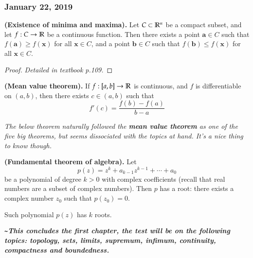 \subsubsection*{January 22, 2019}

\begin{theorem}
  \textbf{(Existence of minima and maxima).} Let $C\subset \mathbb{R}^n$ be a compact subset, and let $f : C\rightarrow \mathbb{R}$ be a continuous function. Then there exists a point $\bm{a}\in C$ such that $f(\bm{a})\geq f(\bm{x})$ for all $\bm{x}\in C$, and a point $\bm{b}\in C$ such that $f(\bm{b})\leq f(\bm{x})$ for all $\bm{x}\in C$.
\end{theorem}
\begin{proof}
  \textit{Detailed in textbook p.109. }
\end{proof}

\begin{theorem}
	  \textbf{(Mean value theorem).} If $f : [a,b] \rightarrow \mathbb{R}$ is continuous, and $f$ is differentiable on $(a,b)$, then there exists $c\in (a,b)$ such that
  \begin{equation}
  	f'(c)=\frac{f(b)-f(a)}{b-a}
  \end{equation}
\end{theorem}

\emph{The below theorem naturally followed the \textbf{mean value theorem} as one of the five big theorems, but seems dissociated with the topics at hand. It's a nice thing to know though. }

\begin{theorem}
	  \textbf{(Fundamental theorem of algebra).} Let
  \begin{equation}
  	p(z)=z^k+a_{k-1}z^{k-1}+\cdots + a_0
  \end{equation}
  be a polynomial of degree $k > 0$ with complex coefficients (recall that real numbers are a subset of complex numbers). Then $p$ has a root: there exists a complex number $z_0$ such that $p(z_0)=0$. 
\end{theorem}

\begin{corollary}
	Such polynomial $p(z)$ has $k$ roots. 
\end{corollary}

\textbf{\emph{\texttt{\~}This concludes the first chapter, the test will be on the following topics: topology, sets, limits, supremum, infimum, continuity, compactness and boundedness.}}\\

